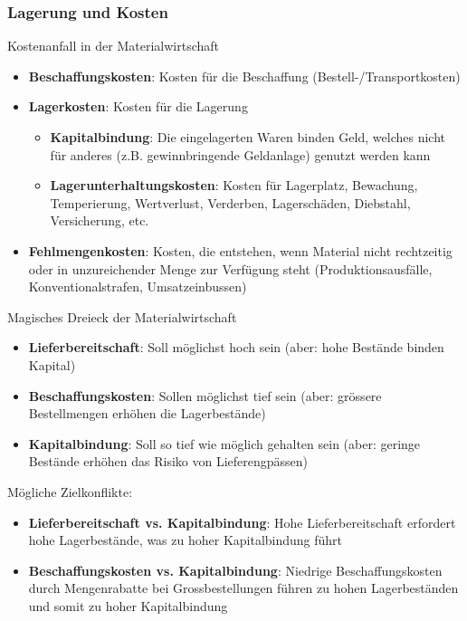 \subsubsection{Lagerung und Kosten}

\begin{definition}{Kostenanfall in der Materialwirtschaft}
\begin{itemize}
    \item \textbf{Beschaffungskosten}: Kosten für die Beschaffung (Bestell-/Transportkosten)
    \item \textbf{Lagerkosten}: Kosten für die Lagerung
    \begin{itemize}
        \item \textbf{Kapitalbindung}: Die eingelagerten Waren binden Geld, welches nicht für anderes (z.B. gewinnbringende Geldanlage) genutzt werden kann
        \item \textbf{Lagerunterhaltungskosten}: Kosten für Lagerplatz, Bewachung, Temperierung, Wertverlust, Verderben, Lagerschäden, Diebstahl, Versicherung, etc.
    \end{itemize}
    \item \textbf{Fehlmengenkosten}: Kosten, die entstehen, wenn Material nicht rechtzeitig oder in unzureichender Menge zur Verfügung steht (Produktionsausfälle, Konventionalstrafen, Umsatzeinbussen)
\end{itemize}
\end{definition}

\begin{concept}{Magisches Dreieck der Materialwirtschaft}
\begin{itemize}
    \item \textbf{Lieferbereitschaft}: Soll möglichst hoch sein (aber: hohe Bestände binden Kapital)
    \item \textbf{Beschaffungskosten}: Sollen möglichst tief sein (aber: grössere Bestellmengen erhöhen die Lagerbestände)
    \item \textbf{Kapitalbindung}: Soll so tief wie möglich gehalten sein (aber: geringe Bestände erhöhen das Risiko von Lieferengpässen)
\end{itemize}

Mögliche Zielkonflikte:
\begin{itemize}
    \item \textbf{Lieferbereitschaft vs. Kapitalbindung}: Hohe Lieferbereitschaft erfordert hohe Lagerbestände, was zu hoher Kapitalbindung führt
    \item \textbf{Beschaffungskosten vs. Kapitalbindung}: Niedrige Beschaffungskosten durch Mengenrabatte bei Grossbestellungen führen zu hohen Lagerbeständen und somit zu hoher Kapitalbindung
\end{itemize}
\end{concept}

